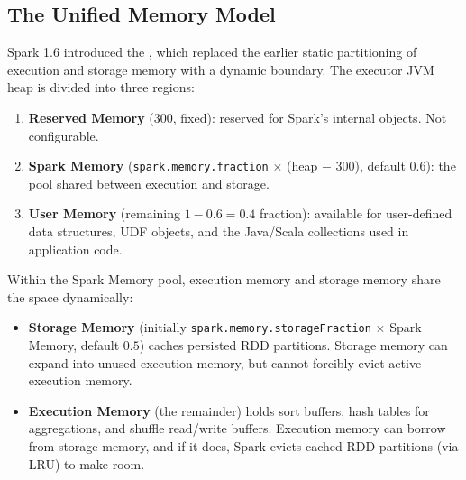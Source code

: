 \subsection{The Unified Memory Model}
\label{subsec:unified-mem}

Spark 1.6 introduced the , which replaced
the earlier static partitioning of execution and storage memory with a
dynamic boundary. The executor JVM heap is divided into three regions:

\begin{enumerate}
  \item \textbf{Reserved Memory} (300\MB, fixed): reserved for Spark's
        internal objects. Not configurable.
  \item \textbf{Spark Memory} (\texttt{spark.memory.fraction} $\times$
        (heap $-$ 300\MB), default $0.6$): the pool shared between
        execution and storage.
  \item \textbf{User Memory} (remaining $1 - 0.6 = 0.4$ fraction):
        available for user-defined data structures, UDF objects, and
        the Java/Scala collections used in application code.
\end{enumerate}

Within the Spark Memory pool, execution memory and storage memory share
the space dynamically:

\begin{itemize}
  \item \textbf{Storage Memory} (initially \texttt{spark.memory.storageFraction}
        $\times$ Spark Memory, default $0.5$) caches persisted RDD
        partitions. Storage memory can expand into unused execution memory,
        but cannot forcibly evict active execution memory.
  \item \textbf{Execution Memory} (the remainder) holds sort buffers,
        hash tables for aggregations, and shuffle read/write buffers.
        Execution memory can borrow from storage memory, and if it does,
        Spark evicts cached RDD partitions (via LRU) to make room.
\end{itemize}

